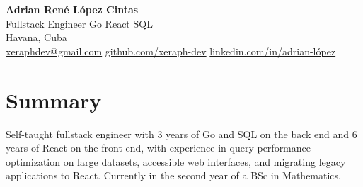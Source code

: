\documentclass[10pt,a4paper]{article}
\begin{document}
\begin{center}
  {\Huge\bfseries Adrian René López Cintas}\\[0.35em]
  {\large\color{accent}Fullstack Engineer \textbullet{} Go \textbullet{} React \textbullet{} SQL}\\[0.35em]
  {\small Havana, Cuba}\\[0.2em]
  {\small \href{mailto:xeraphdev@gmail.com}{xeraphdev@gmail.com} \textbullet{} \href{https://github.com/xeraph-dev}{github.com/xeraph-dev} \textbullet{} \href{https://www.linkedin.com/in/adrian-l%C3%B3pez/}{linkedin.com/in/adrian-lópez}}
\end{center}

\section*{Summary}
Self-taught fullstack engineer with 3 years of Go and SQL on the back end and 6 years of React on the front end, with experience in query performance optimization on large datasets, accessible web interfaces, and migrating legacy applications to React. Currently in the second year of a BSc in Mathematics.

\end{document}
